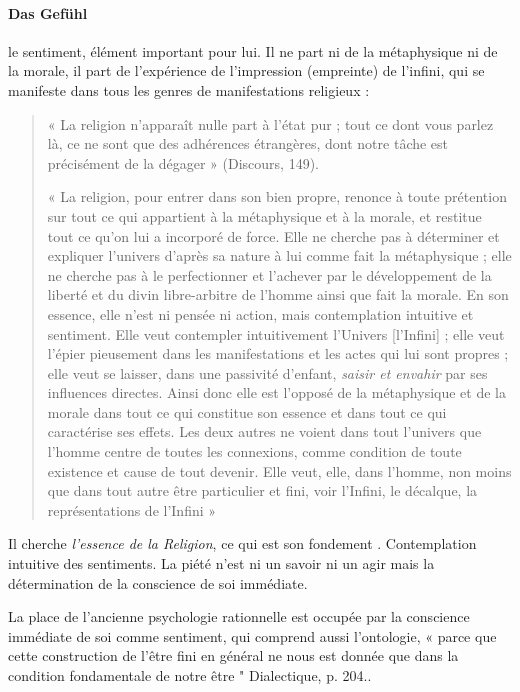 \paragraph{Das Gefühl} le sentiment, élément important pour lui. Il ne part ni de la métaphysique ni de la morale, il part de l'expérience de l'impression (empreinte) de l'infini, qui se manifeste dans tous les genres de manifestations religieux  :

\begin{quote}
    « La religion n’apparaît nulle part à l’état pur ; tout ce dont vous parlez là, ce ne sont que des adhérences étrangères, dont notre tâche est précisément de la dégager » (Discours, 149). 
    
    « La religion, pour entrer dans son bien propre, renonce à toute prétention sur tout ce qui appartient à la métaphysique et à la morale, et restitue tout ce qu’on lui a incorporé de force. Elle ne cherche pas à déterminer et expliquer l’univers d’après sa nature à lui comme fait la métaphysique ; elle ne cherche pas à le perfectionner et l’achever par le développement de la liberté et du divin libre-arbitre de l’homme ainsi que fait la morale. En son essence, elle n’est ni pensée ni action, mais contemplation intuitive et sentiment. Elle veut contempler intuitivement l’Univers [l’Infini] ; elle veut l’épier pieusement dans les manifestations et les actes qui lui sont propres ; elle veut se laisser, dans une passivité d’enfant, \textit{saisir et envahir} par ses influences directes. Ainsi donc elle est l’opposé de la métaphysique et de la morale dans tout ce qui constitue son essence et dans tout ce qui caractérise ses effets. Les deux autres ne voient dans tout l’univers que l’homme centre de toutes les connexions, comme condition de toute existence et cause de tout devenir. Elle veut, elle, dans l’homme, non moins que dans tout autre être particulier et fini, voir l’Infini, le décalque, la représentations de l’Infini » 
\end{quote}

Il cherche \textit{l'essence de la Religion}, ce qui est son fondement . Contemplation intuitive des sentiments.
La piété n'est ni un savoir ni un agir mais la détermination de la conscience de soi immédiate.

\begin{Def}
La place de l’ancienne psychologie rationnelle est occupée par la conscience immédiate de soi comme sentiment, qui comprend aussi l’ontologie, « parce que cette construction de l’être fini en général ne nous est donnée que dans la condition fondamentale de notre être " Dialectique, p. 204.. 
\end{Def}

